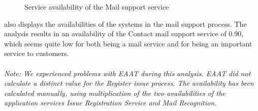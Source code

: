 \begin{center}
	\begin{figure}[H]
		\centering
		\setlength\fboxsep{7pt}
		\setlength\fboxrule{0.5pt}
		\caption{Service availability of the Mail support service}
		\label{fig:map_support_mail_availability}
	\end{figure}
\end{center}


 also displays the availabilities of the systems in the mail support process. The analysis results in an availability of the Contact mail support service of 0.90, which seems quite low for both being a mail service and for being an important service to customers.\\\\
%
\emph{Note: We experienced problems with EAAT during this analysis. EAAT did not calculate a distinct value for the Register issue process. The availability has been calculated manually, using multiplication of the two availabilities of the application services Issue Registration Service and Mail Recognition.}
%

